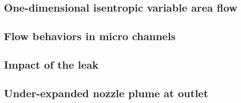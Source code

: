 \subsection{One-dimensional isentropic variable area flow}\label{sec:one-dim-isentropic}
	
	\newpage

\subsection{Flow behaviors in micro channels}\label{sec:micro-channels}
	
	\newpage

\subsection{Impact of the leak}\label{sec:disconnected-reservoirs}
	
	\newpage

\subsection{Under-expanded nozzle plume at outlet}\label{sec:outlet_plume}
	
	\newpage

